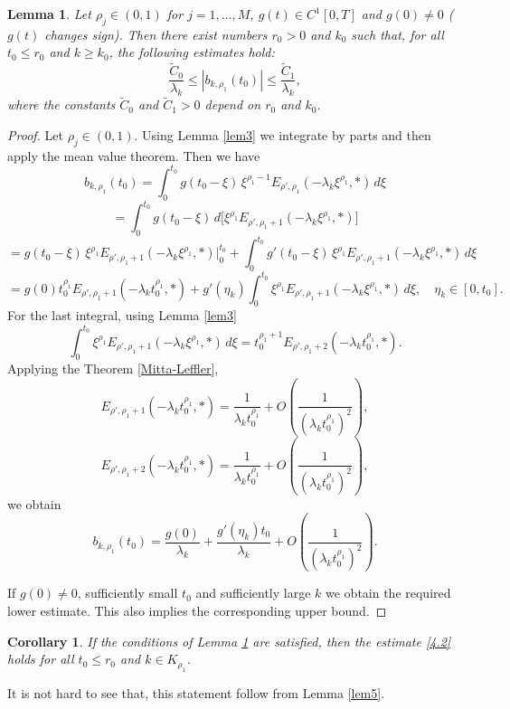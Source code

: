\documentclass[12pt, reqno]{amsart}
\newtheorem{lemma}[theorem]{Lemma}
\newtheorem{corollary}[theorem]{Corollary}
\theoremstyle{definition}
\theoremstyle{remark}
\numberwithin{equation}{section}
\begin{document}
\begin{lemma}\label{lem6}  Let $\rho_j \in (0,1)$ for $j=1,\dots,M$, $g(t) \in C^1[0,T]$ and $g(0)\neq 0$ ($g(t)$  changes sign). Then there exist numbers $r_0 > 0$ and $k_0$ such that, for all $t_0 \le r_0$ and $k \ge k_0$, the following estimates hold:
\begin{equation}\label{4.2}
 \frac{\widetilde C_0}{\lambda_k} \le |b_{k,\rho_1}(t_0)| \le  \frac{\widetilde C_1}{\lambda_k},
\end{equation}
where the constants $\widetilde C_0$ and $\widetilde C_1 > 0$ depend on $r_0$ and $k_0$.\end{lemma}
\begin{proof} 
Let $\rho_j \in (0,1)$. Using Lemma \ref{lem3} we integrate by parts and then apply the mean value theorem. Then we have
$$
b_{k,\rho_1}(t_0) 
= \int_0^{t_0} g(t_0 - \xi) \, \xi^{\rho_1-1} E_{\rho',\rho_1}(-\lambda_k \xi^{\rho_1},*) \, d\xi $$
$$= \int_0^{t_0} g(t_0 - \xi) \, d\big[ \xi^{\rho_1} E_{\rho',\rho_1+1}(-\lambda_k \xi^{\rho_1},*) \big] $$
$$= g(t_0 - \xi) \, \xi^{\rho_1} E_{\rho',\rho_1+1}(-\lambda_k \xi^{\rho_1},*) \Big|_{0}^{t_0} 
+ \int_0^{t_0} g'(t_0 - \xi) \, \xi^{\rho_1} E_{\rho',\rho_1+1}(-\lambda_k \xi^{\rho_1},*) \, d\xi $$
$$= g(0) t_0^{\rho_1} E_{\rho',\rho_1+1}(-\lambda_k t_0^{\rho_1},*) + g'(\eta_k) \int_0^{t_0} \xi^{\rho_1} E_{\rho',\rho_1+1}(-\lambda_k \xi^{\rho_1},*) \, d\xi, \quad \eta_k \in [0,t_0].
$$
For the last integral, using Lemma \ref{lem3}
\[
\int_0^{t_0} \xi^{\rho_1} E_{\rho',\rho_1+1}(-\lambda_k \xi^{\rho_1},*) \, d\xi = t_0^{\rho_1+1} E_{\rho',\rho_1+2}(-\lambda_k t_0^{\rho_1},*).
\]
Applying the Theorem \ref{Mitta-Leffler}, 
$$
E_{\rho',\rho_1+1}\!\left(-\lambda_k t_0^{\rho_1},*\right)
=
\frac{1}{\lambda_k t_0^{\rho_1}} +O\left(\frac{1}{(\lambda_k t^{\rho_1}_0)^{2}}\right),
 $$
$$
E_{\rho',\rho_1+2}\!\left(-\lambda_k t_0^{\rho_1},*\right)
=
\frac{1}{\lambda_k t_0^{\rho_1}} +O\left(\frac{1}{(\lambda_k t^{\rho_1}_0)^{2}}\right),
$$
we obtain
\[
b_{k,\rho_1}(t_0) = \frac{g(0)}{\lambda_k} + \frac{g'(\eta_k) t_0}{\lambda_k } +  O\left(\frac{1}{(\lambda_k t^{\rho_1}_0)^{2}}\right).
\]

If $g(0) \neq 0$, sufficiently small $t_0$  and sufficiently large $k$ we obtain the required lower estimate. This also implies the corresponding upper bound. 
\end{proof}
\begin{corollary}\label{cor1}
If the conditions of Lemma \ref{lem6} are satisfied, then the estimate \eqref{4.2} holds for all $t_0 \le r_0$ and $k \in K_{\rho_1}$.
\end{corollary}
  It is not hard to see that, this statement follow from Lemma \ref{lem5}.
\end{document}

